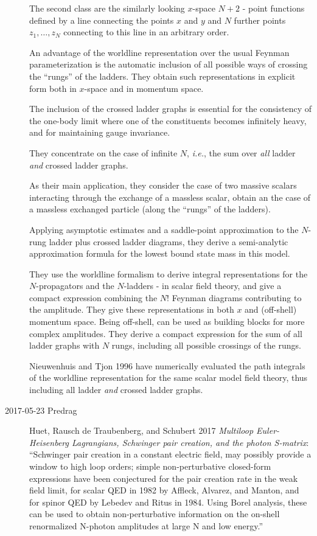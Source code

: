 \begin{description}
The second class are the similarly looking  $x$-space $N+2$ - point
functions %
defined by a line connecting
the points $x$ and $y$ and $N$ further points $z_1,\ldots,z_N$ connecting
to this line in an arbitrary order.

An advantage of the worldline representation over the usual Feynman
parameterization is the automatic inclusion of all possible ways of
crossing the ``rungs'' of the ladders. They obtain such representations
in explicit form both in $x$-space and in momentum space.

The inclusion of the crossed ladder graphs is essential for the
consistency of the one-body limit where one of the constituents becomes
infinitely heavy, and for maintaining gauge invariance.

They concentrate on the case of infinite $N$, \hbox{\it i.e.}, the sum
over {\it all} ladder {\it and} crossed ladder graphs.

As their main application, they consider the case of two massive scalars
interacting through the exchange of a massless scalar, obtain an the case
of a massless exchanged particle (along the ``rungs'' of the ladders).

Applying
asymptotic estimates and a saddle-point approximation to the $N$-rung
ladder plus crossed ladder diagrams, they derive a semi-analytic
approximation formula for the lowest bound state mass in this model.

They use the worldline formalism to derive integral representations for
the $N$-propagators and the $N$-ladders - in scalar field theory,
and give a compact expression combining the $N!$ Feynman diagrams
contributing to the amplitude. They give these representations in both
$x$ and (off-shell) momentum space. Being off-shell, can be used
as building blocks for more complex amplitudes. They derive a
compact expression for the sum of all ladder graphs with $N$ rungs,
including all possible crossings of the rungs.

Nieuwenhuis and Tjon 1996 have numerically evaluated the path
integrals of the worldline representation for the same scalar model field
theory, thus including all ladder {\it and}
crossed ladder graphs.

\item[2017-05-23 Predrag]
Huet, Rausch de Traubenberg, and Schubert 2017
{\em Multiloop {Euler-Heisenberg Lagrangians, Schwinger} pair creation,
and the photon {S-matrix}}:
``Schwinger pair creation in a constant electric field, may possibly
provide a window to high loop orders; simple non-perturbative closed-form
expressions have been conjectured for the pair creation rate in the weak
field limit, for scalar QED in 1982 by Affleck, Alvarez, and
Manton, and for spinor QED by Lebedev and
Ritus in 1984. Using Borel analysis, these can be used to
obtain non-perturbative information on the on-shell renormalized N-photon
amplitudes at large N and low energy.''


\end{description}
